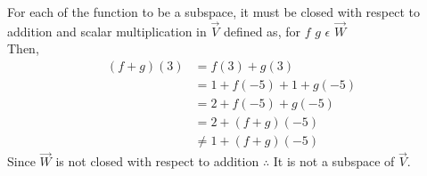For each of the function to be a subspace, it must be closed with respect to addition and scalar multiplication in $\vec{V}$ defined as, for $f$ $g$ $\epsilon$ $\vec{W}$\\
Then,
\begin{align}
(f+g)(3)&=f(3)+g(3)\\
&=1+f(-5)+1+g(-5)\\
&=2+f(-5)+g(-5)\\
&=2+(f+g)(-5)\\
&\ne1+(f+g)(-5)
\end{align}
Since $\vec{W}$ is not closed with respect to addition $\therefore$ It is not a subspace of $\vec{V}$.

